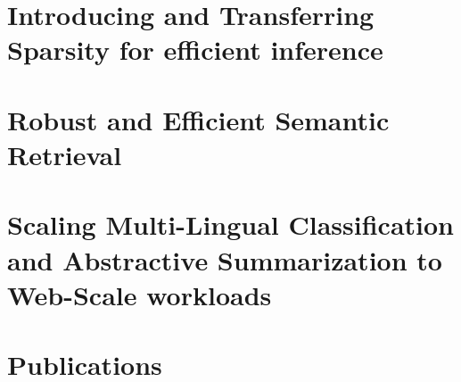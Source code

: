 \section{Introducing and Transferring Sparsity for efficient inference}
\label{app:sparsity}
\section{Robust and Efficient Semantic Retrieval}
\label{app:retrieval}

\section{Scaling Multi-Lingual Classification and Abstractive Summarization to Web-Scale workloads}
\label{app:scaling-workload}

\section{Publications}
